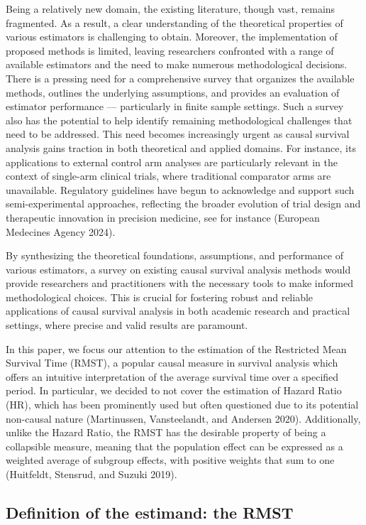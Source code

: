 \documentclass[
  11pt,
  a4paper,
]{article}
\theoremstyle{plain}
\theoremstyle{plain}
\theoremstyle{plain}
\theoremstyle{definition}
\theoremstyle{remark}
\begin{document}
Being a relatively new domain, the existing literature, though vast,
remains fragmented. As a result, a clear understanding of the
theoretical properties of various estimators is challenging to obtain.
Moreover, the implementation of proposed methods is limited, leaving
researchers confronted with a range of available estimators and the need
to make numerous methodological decisions. There is a pressing need for
a comprehensive survey that organizes the available methods, outlines
the underlying assumptions, and provides an evaluation of estimator
performance --- particularly in finite sample settings. Such a survey
also has the potential to help identify remaining methodological
challenges that need to be addressed. This need becomes increasingly
urgent as causal survival analysis gains traction in both theoretical
and applied domains. For instance, its applications to external control
arm analyses are particularly relevant in the context of single-arm
clinical trials, where traditional comparator arms are unavailable.
Regulatory guidelines have begun to acknowledge and support such
semi-experimental approaches, reflecting the broader evolution of trial
design and therapeutic innovation in precision medicine, see for
instance (European Medecines Agency 2024).

By synthesizing the theoretical foundations, assumptions, and
performance of various estimators, a survey on existing causal survival
analysis methods would provide researchers and practitioners with the
necessary tools to make informed methodological choices. This is crucial
for fostering robust and reliable applications of causal survival
analysis in both academic research and practical settings, where precise
and valid results are paramount.

In this paper, we focus our attention to the estimation of the
Restricted Mean Survival Time (RMST), a popular causal measure in
survival analysis which offers an intuitive interpretation of the
average survival time over a specified period. In particular, we decided
to not cover the estimation of Hazard Ratio (HR), which has been
prominently used but often questioned due to its potential non-causal
nature (Martinussen, Vansteelandt, and Andersen 2020). Additionally,
unlike the Hazard Ratio, the RMST has the desirable property of being a
collapsible measure, meaning that the population effect can be expressed
as a weighted average of subgroup effects, with positive weights that
sum to one (Huitfeldt, Stensrud, and Suzuki 2019).

\subsection{Definition of the estimand: the RMST}\label{sec-notations}
\end{document}
